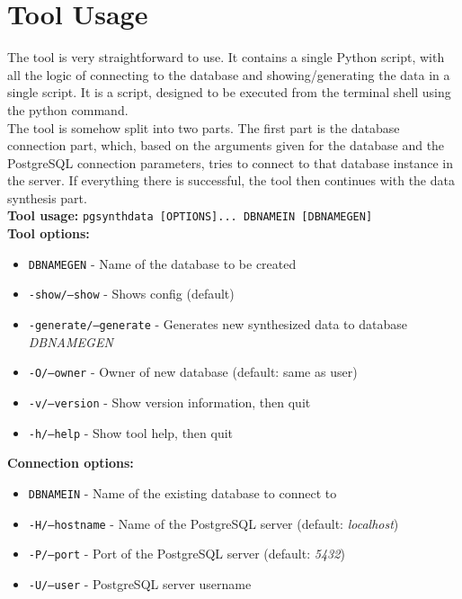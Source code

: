\section{Tool Usage}
The tool is very straightforward to use. It contains a single Python script, with all the logic of connecting to the database and showing/generating the data in a single script. It is a script, designed to be executed from the terminal shell using the python command.\\
The tool is somehow split into two parts. The first part is the database connection part, which, based on the arguments given for the database and the PostgreSQL connection parameters, tries to connect to that database instance in the server. If everything there is successful, the tool then continues with the data synthesis part.\\
\newline
\textbf{Tool usage:} \newline
\texttt{pgsynthdata [OPTIONS]... DBNAMEIN [DBNAMEGEN]} \\
\newline
\textbf{Tool options:}
\begin{itemize}
\item \texttt{DBNAMEGEN} - Name of the database to be created
\item \texttt{-show/--show} - Shows config (default)
\item \texttt{-generate/--generate} - Generates new synthesized data to database \textit{DBNAMEGEN}
\item \texttt{-O/--owner} - Owner of new database (default: same as user)
\item \texttt{-v/--version} - Show version information, then quit
\item \texttt{-h/--help} - Show tool help, then quit
\newline
\end{itemize}
\textbf{Connection options:}
\begin{itemize}
\item \texttt{DBNAMEIN} - Name of the existing database to connect to
\item \texttt{-H/--hostname} - Name of the PostgreSQL server (default: \textit{localhost})
\item \texttt{-P/--port} - Port of the PostgreSQL server (default: \textit{5432})
\item \texttt{-U/--user} - PostgreSQL server username
\newline
\end{itemize}
